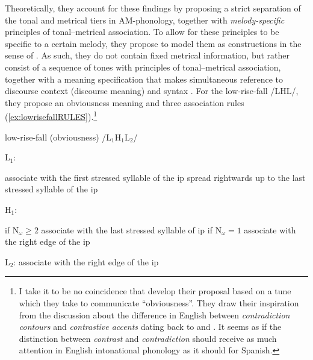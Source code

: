 Theoretically, they account for these findings by proposing a strict separation of the tonal and metrical tiers in \ac{AM}-phonology, together with \textit{melody-specific} principles of tonal--metrical association. To allow for these principles to be specific to a certain melody, they propose to model them as constructions in the sense of \citet{KayFillmore.1999,Croft.2001,Jackendoff.2002,Goldberg.2006}. As such, they do not contain fixed metrical information, but rather consist of a sequence of tones with principles of tonal--metrical association, together with a meaning specification that makes simultaneous reference to discourse context (discourse meaning) and syntax \citep[28--29]{TorreiraGrice.2018}. For the low-rise-fall /LHL/, they propose an obviousness meaning and three association rules (\ref{ex:lowrisefallRULES}).\footnote{I take it to be no coincidence that \citet{TorreiraGrice.2018} develop their proposal based on a tune which they take to communicate ``obviousness''. They draw their inspiration from the discussion about the difference in English between \textit{contradiction contours} and \textit{contrastive accents} dating back to \citet{LibermanSag.1974} and \citet{Grice.1995}. It seems as if the distinction between \textit{contrast} and \textit{contradiction} should receive as much attention in English intonational phonology as it should for Spanish.}

\begin{exe}
\ex\label{ex:lowrisefallRULES} low-rise-fall (obviousness) /L$_1$H$_1$L$_2$/ 
\begin{xlist}
	\ex L$_1$:
	\begin{xlist}
		\ex associate with the first stressed syllable of the ip 
		\ex spread rightwards up to the last stressed syllable of the ip 
	\end{xlist}
	\ex H$_1$: 
	\begin{xlist}
		\ex if N$_\omega \geq 2$ associate with the last stressed syllable of ip 
		\ex if N$_\omega = 1$ associate with the right edge of the ip 
	\end{xlist}
	\ex  L$_2$: associate with the right edge of the ip 
\end{xlist}
\end{exe}

